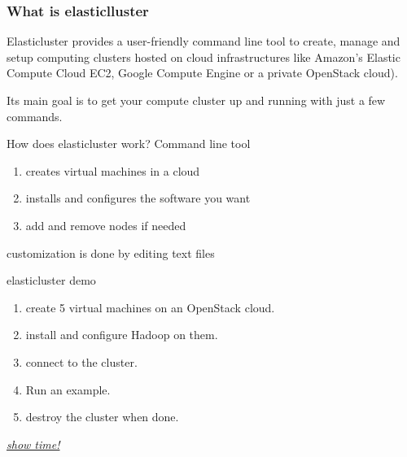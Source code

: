 \documentclass[english,serif,mathserif,usenames,dvipsnames]{beamer}
\begin{document}
\begin{frame}
  \frametitle{What is elasticlluster}
  \begin{block}{}
    Elasticluster provides a user-friendly {\color{Blue}command line} tool to {\color{Blue}create, manage and setup} computing clusters hosted on cloud infrastructures like Amazon's Elastic Compute Cloud EC2, Google Compute Engine or a private OpenStack cloud). \\
  \end{block}
  \begin{block}{}
    Its main goal is to get your compute cluster {\color{Blue}up and running} with just a few commands.
  \end{block}
\end{frame}

\begin{frame}
  {How does elasticluster work?}
  Command line tool
\+
  \begin{enumerate}
  \item creates virtual machines in a cloud
  \item {\color{Blue}installs and configures} the software you want
  \item add and remove nodes if needed
  \end{enumerate}
\+

  customization is done by editing {\color{Blue}text files}
\end{frame}

\begin{frame}
  {elasticluster demo}

  \begin{enumerate}
  \item create 5 virtual machines on an OpenStack cloud.
  \item install and configure Hadoop on them.
  \item connect to the cluster.
  \item Run an example.
  \item destroy the cluster when done.
  \end{enumerate}
  \pause
  \begin{center}
    \href{http://youtu.be/-Z4FaXEivVo}{\textit{show time!}}
  \end{center}
\end{frame}
\end{document}
